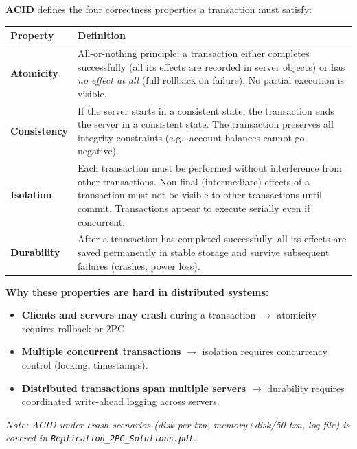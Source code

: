 \documentclass[11pt,a4paper]{article}
\begin{document}
\begin{answerbox}
\textbf{ACID} defines the four correctness properties a transaction must satisfy:

\begin{center}
\begin{tabular}{p{2.5cm}p{10.5cm}}
\toprule
\textbf{Property} & \textbf{Definition} \\
\midrule
\textbf{Atomicity} &
All-or-nothing principle: a transaction either completes successfully (all its effects are recorded in server objects) or has \emph{no effect at all} (full rollback on failure). No partial execution is visible. \\
\addlinespace
\textbf{Consistency} &
If the server starts in a consistent state, the transaction ends the server in a consistent state. The transaction preserves all integrity constraints (e.g., account balances cannot go negative). \\
\addlinespace
\textbf{Isolation} &
Each transaction must be performed without interference from other transactions. Non-final (intermediate) effects of a transaction must not be visible to other transactions until commit. Transactions appear to execute serially even if concurrent. \\
\addlinespace
\textbf{Durability} &
After a transaction has completed successfully, all its effects are saved permanently in stable storage and survive subsequent failures (crashes, power loss). \\
\bottomrule
\end{tabular}
\end{center}

\textbf{Why these properties are hard in distributed systems:}
\begin{itemize}
  \item \textbf{Clients and servers may crash} during a transaction $\to$ atomicity requires rollback or 2PC.
  \item \textbf{Multiple concurrent transactions} $\to$ isolation requires concurrency control (locking, timestamps).
  \item \textbf{Distributed transactions span multiple servers} $\to$ durability requires coordinated write-ahead logging across servers.
\end{itemize}

\textit{Note: ACID under crash scenarios (disk-per-txn, memory+disk/50-txn, log file) is covered in \texttt{Replication\_2PC\_Solutions.pdf}.}
\end{answerbox}
\end{document}
